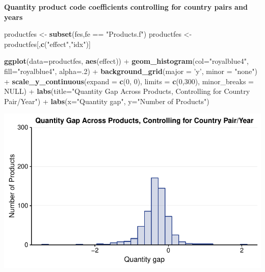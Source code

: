 \documentclass[10pt,]{article}
\newenvironment{Shaded}{\begin{snugshade}}{\end{snugshade}}
\newcommand{\KeywordTok}[1]{\textcolor[rgb]{0.13,0.29,0.53}{\textbf{{#1}}}}
\newcommand{\DataTypeTok}[1]{\textcolor[rgb]{0.13,0.29,0.53}{{#1}}}
\newcommand{\DecValTok}[1]{\textcolor[rgb]{0.00,0.00,0.81}{{#1}}}
\newcommand{\StringTok}[1]{\textcolor[rgb]{0.31,0.60,0.02}{{#1}}}
\newcommand{\OtherTok}[1]{\textcolor[rgb]{0.56,0.35,0.01}{{#1}}}
\newcommand{\NormalTok}[1]{{#1}}
\begin{document}
\textbf{Quantity product code coefficients controlling for country pairs
and years}

\begin{Shaded}
\begin{Highlighting}[]
\NormalTok{productfes <-}\StringTok{ }\KeywordTok{subset}\NormalTok{(fes,fe ==}\StringTok{ "Products.f"}\NormalTok{)}
\NormalTok{productfes <-}\StringTok{ }\NormalTok{productfes[,}\KeywordTok{c}\NormalTok{(}\StringTok{"effect"}\NormalTok{,}\StringTok{"idx"}\NormalTok{)]}

\KeywordTok{ggplot}\NormalTok{(}\DataTypeTok{data=}\NormalTok{productfes, }\KeywordTok{aes}\NormalTok{(effect)) +}
\StringTok{  }\KeywordTok{geom_histogram}\NormalTok{(}\DataTypeTok{col=}\StringTok{"royalblue4"}\NormalTok{,}
                 \DataTypeTok{fill=}\StringTok{"royalblue4"}\NormalTok{,}
                 \DataTypeTok{alpha=}\NormalTok{.}\DecValTok{2}\NormalTok{) +}
\StringTok{  }\KeywordTok{background_grid}\NormalTok{(}\DataTypeTok{major =} \StringTok{'y'}\NormalTok{, }\DataTypeTok{minor =} \StringTok{"none"}\NormalTok{) +}
\StringTok{  }\KeywordTok{scale_y_continuous}\NormalTok{(}\DataTypeTok{expand =} \KeywordTok{c}\NormalTok{(}\DecValTok{0}\NormalTok{, }\DecValTok{0}\NormalTok{), }\DataTypeTok{limits =} \KeywordTok{c}\NormalTok{(}\DecValTok{0}\NormalTok{,}\DecValTok{300}\NormalTok{), }\DataTypeTok{minor_breaks =} \OtherTok{NULL}\NormalTok{) +}
\StringTok{  }\KeywordTok{labs}\NormalTok{(}\DataTypeTok{title=}\StringTok{"Quantity Gap Across Products, Controlling for Country Pair/Year"}\NormalTok{) +}
\StringTok{  }\KeywordTok{labs}\NormalTok{(}\DataTypeTok{x=}\StringTok{"Quantity gap"}\NormalTok{, }\DataTypeTok{y=}\StringTok{"Number of Products"}\NormalTok{)}
\end{Highlighting}
\end{Shaded}

\begin{center}\includegraphics{Figs/quantity_products_reg-1} \end{center}
\end{document}
